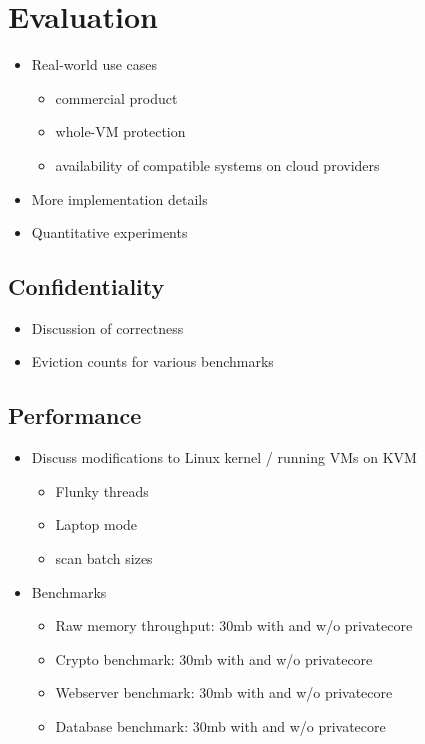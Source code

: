 \section{Evaluation}
\label{sec:evaluation}

\begin{itemize}
  \item Real-world use cases
    \begin{itemize}
      \item commercial product
      \item whole-VM protection
      \item availability of compatible systems on cloud providers
    \end{itemize}
  \item More implementation details
  \item Quantitative experiments
\end{itemize}

\subsection{Confidentiality}

\begin{itemize}
  \item Discussion of correctness
  \item Eviction counts for various benchmarks
\end{itemize}

\subsection{Performance}

\begin{itemize}
  \item Discuss modifications to Linux kernel / running VMs on KVM
    \begin{itemize}
      \item Flunky threads
      \item Laptop mode
      \item scan batch sizes
    \end{itemize}

  \item Benchmarks
    \begin{itemize}
      \item Raw memory throughput: 30mb with and w/o privatecore
      \item Crypto benchmark: 30mb with and w/o privatecore
      \item Webserver benchmark: 30mb with and w/o privatecore
      \item Database benchmark: 30mb with and w/o privatecore
    \end{itemize}
\end{itemize}

